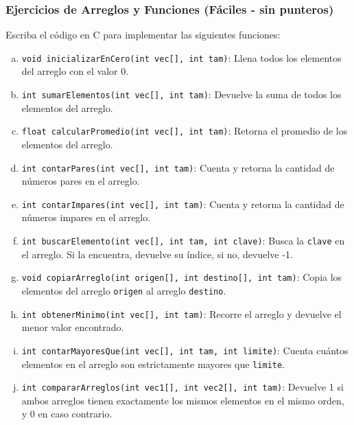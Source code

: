 \begin{ejercicioClase}
    \subsubsection{Ejercicios de Arreglos y Funciones (Fáciles - sin punteros)}
    Escriba el código en C para implementar las siguientes funciones:
    \begin{enumerate}[a)]
        \item \texttt{void inicializarEnCero(int vec[], int tam)}: Llena todos los elementos del arreglo con el valor 0.
        \item \texttt{int sumarElementos(int vec[], int tam)}: Devuelve la suma de todos los elementos del arreglo.
        \item \texttt{float calcularPromedio(int vec[], int tam)}: Retorna el promedio de los elementos del arreglo.
        \item \texttt{int contarPares(int vec[], int tam)}: Cuenta y retorna la cantidad de números pares en el arreglo.
        \item \texttt{int contarImpares(int vec[], int tam)}: Cuenta y retorna la cantidad de números impares en el arreglo.
        \item \texttt{int buscarElemento(int vec[], int tam, int clave)}: Busca la \texttt{clave} en el arreglo. Si la encuentra, devuelve su índice, si no, devuelve -1.
        \item \texttt{void copiarArreglo(int origen[], int destino[], int tam)}: Copia los elementos del arreglo \texttt{origen} al arreglo \texttt{destino}.
        \item \texttt{int obtenerMinimo(int vec[], int tam)}: Recorre el arreglo y devuelve el menor valor encontrado.
        \item \texttt{int contarMayoresQue(int vec[], int tam, int limite)}: Cuenta cuántos elementos en el arreglo son estrictamente mayores que \texttt{limite}.
        \item \texttt{int compararArreglos(int vec1[], int vec2[], int tam)}: Devuelve 1 si ambos arreglos tienen exactamente los mismos elementos en el mismo orden, y 0 en caso contrario.
    \end{enumerate}


\end{ejercicioClase}
